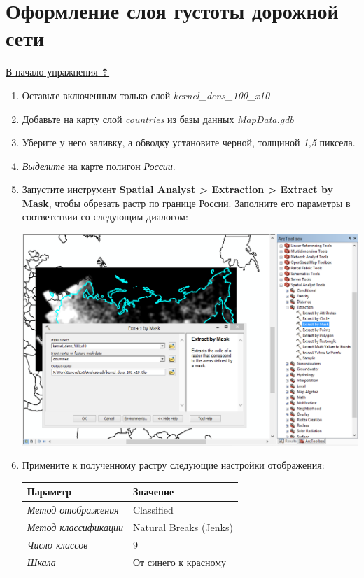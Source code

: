 \documentclass[]{book}
\theoremstyle{definition}
\theoremstyle{definition}
\theoremstyle{definition}
\theoremstyle{remark}
\begin{document}
\hypertarget{density-analysis-layer}{%
\section{Оформление слоя густоты дорожной
сети}\label{density-analysis-layer}}

\protect\hyperlink{density-analysis}{В начало упражнения ⇡}

\begin{enumerate}
\def\labelenumi{\arabic{enumi}.}
\item
  Оставьте включенным только слой \emph{kernel\_dens\_100\_x10}
\item
  Добавьте на карту слой \emph{countries} из базы данных
  \emph{MapData.gdb}
\item
  Уберите у него заливку, а обводку установите черной, толщиной
  \emph{1,5} пиксела.
\item
  \emph{Выделите} на карте полигон \emph{России}.
\item
  Запустите инструмент \textbf{Spatial Analyst \textgreater{} Extraction
  \textgreater{} Extract by Mask}, чтобы обрезать растр по границе
  России. Заполните его параметры в соответствии со следующим диалогом:

  \includegraphics{images/Ex16/image15.png}
\item
  Примените к полученному растру следующие настройки отображения:

  \begin{longtable}[]{@{}ll@{}}
  \toprule
  Параметр & Значение\tabularnewline
  \midrule
  \endhead
  \emph{Метод отображения} & Classified\tabularnewline
  \emph{Метод классификации} & Natural Breaks (Jenks)\tabularnewline
  \emph{Число классов} & 9\tabularnewline
  \emph{Шкала} & От синего к красному\tabularnewline
  \bottomrule
  \end{longtable}


\end{enumerate}
\end{document}
